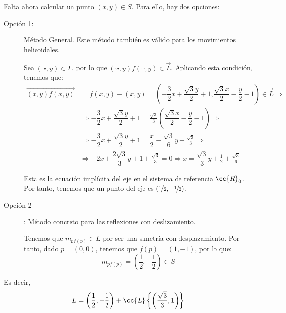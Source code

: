 \begin{ejercicio}
\begin{enumerate}
        Falta ahora calcular un punto $(x,y)\in S$. Para ello, hay dos opciones:
        \begin{description}
            \item[Opción 1:] Método General. Este método también es válido para los movimientos helicoidales.



            Sea $(x,y)\in L$, por lo que $\vec{(x,y)f(x,y)}\in \vec{L}$. Aplicando esta condición, tenemos que:
        \begin{align*}
            \vec{(x,y)f(x,y)} &= f(x,y) - (x,y)
            = \left(-\dfrac{3}{2}x + \dfrac{\sqrt{3}y}{2} + 1,\dfrac{\sqrt{3} x}{2} - \dfrac{y}{2} - 1\right) \in \vec{L} \Longrightarrow \\ &\Longrightarrow 
            -\dfrac{3}{2}x + \dfrac{\sqrt{3}y}{2} + 1 = \frac{\sqrt{3}}{3}\left(\dfrac{\sqrt{3} x}{2} - \dfrac{y}{2} - 1\right)
            \Longrightarrow \\ &\Longrightarrow
            -\dfrac{3}{2}x + \dfrac{\sqrt{3}y}{2} + 1 = \dfrac{x}{2} - \dfrac{\sqrt{3}}{6}y - \frac{\sqrt{3}}{3} \Longrightarrow \\ &\Longrightarrow
            -2x + \dfrac{2\sqrt{3}}{3}y + 1 + \frac{\sqrt{3}}{3} = 0
            \Longrightarrow x = \dfrac{\sqrt{3}}{3}y + \frac{1}{2} + \frac{\sqrt{3}}{6}
        \end{align*}

        Esta es la ecuación implícita del eje en el sistema de referencia $\cc{R}_0$. Por tanto, tenemos que un punto del eje es $\left(\nicefrac{1}{2},\nicefrac{-1}{2}\right)$.


            \item[Opción 2]: Método concreto para las reflexiones con deslizamiento.
            
            
            Tenemos que $m_{pf(p)}\in L$ por ser una simetría con desplazamiento. Por tanto, dado $p=(0,0)$, tenemos que $f(p)=(1,-1)$, por lo que:
            \begin{equation*}
                m_{pf(p)} = \left(\frac{1}{2}, -\frac{1}{2}\right)\in S
            \end{equation*}
        \end{description}

        
        Es decir,
        \begin{equation*}
            L = \left(\frac{1}{2}, -\frac{1}{2}\right) + \cc{L}\left\{\left(\frac{\sqrt{3}}{3}, 1\right)\right\}
        \end{equation*}


\end{enumerate}
\end{ejercicio}
